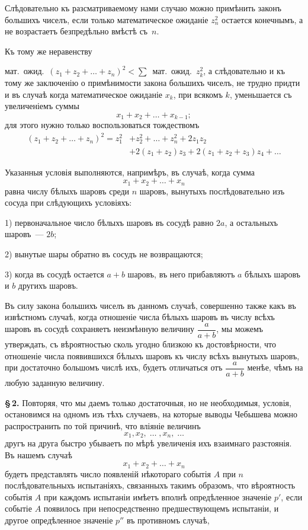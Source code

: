 \documentclass[12pt]{article}
\begin{document}
Слѣдовательно къ разсматриваемому нами случаю можно примѣнить законъ большихъ чиселъ, если только математическое ожиданіе $z_n^2$ остается конечнымъ, а не возрастаетъ безпредѣльно вмѣстѣ съ~$n$.

Къ тому же неравенству

мат.~ожид.\ $(z_1 + z_2 + \ldots + z_n)^2 < \sum$~мат.~ожид.\ $z^2_k$, а слѣдовательно и къ тому же заключенію о примѣнимости закона большихъ чиселъ, не трудно придти и въ случаѣ когда математическое ожиданіе $x_k$, при всякомъ $k$, уменьшается съ увеличеніемъ суммы
\[
x_1 + x_2 + \ldots + x_{k-1};
\]
для этого нужно только воспользоваться тождествомъ
\begin{align*}
(z_1 + z_2 + \ldots + z_n)^2 = z_1^2 &+ z_2^2 + \ldots + z_n^2 + 2z_1 z_2 \\
&+ 2(z_1 + z_2)z_3 + 2(z_1 + z_2 + z_3)z_4 + \ldots
\end{align*}

Указанныя условія выполняются, напримѣръ, въ случаѣ, когда сумма
\[
x_1 + x_2 + \ldots + x_n
\]
равна числу бѣлыхъ шаровъ среди $n$ шаровъ, вынутыхъ послѣдовательно изъ сосуда при слѣдующихъ условіяхъ:


1) первоначальное число бѣлыхъ шаровъ въ сосудѣ равно $2a$, а остальныхъ шаровъ~--- $2b$;

2) вынутые шары обратно въ сосудъ не возвращаются;

3) когда въ сосудѣ остается $a + b$ шаровъ, въ него прибавляютъ $a$ бѣлыхъ шаровъ и $b$ другихъ шаровъ.

Въ силу закона большихъ чиселъ въ данномъ случаѣ, совершенно также какъ въ извѣстномъ случаѣ, когда отношеніе числа бѣлыхъ шаровъ въ числу всѣхъ шаровъ въ сосудѣ сохраняетъ неизмѣнную величину $\dfrac{a}{a+b}$, мы можемъ утверждать, съ вѣроятностью сколь угодно близкою къ достовѣрности, что отношеніе числа появившихся бѣлыхъ шаровъ къ числу всѣхъ вынутыхъ шаровъ, при достаточно большомъ числѣ ихъ, будетъ отличаться отъ $\dfrac{a}{a+b}$ менѣе, чѣмъ на любую заданную величину.

\medskip

\noindent\textbf{\S\,2.} Повторяя, что мы даемъ только достаточныя, но не необходимыя, условія, остановимся на одномъ изъ тѣхъ случаевъ, на которые выводы Чебышева можно распространить по той причинѣ, что вліяніе величинъ
\[
x_1, x_2, \;\ldots\;, x_n, \;\ldots
\]
другъ на друга быстро убываетъ по мѣрѣ увеличенія ихъ взаимнаго разстоянія. Въ нашемъ случаѣ
\[
x_1 + x_2 + \ldots + x_n
\]
будетъ представлять число появленій нѣкотораго событія $A$ при $n$ послѣдовательныхъ испытаніяхъ, связанныхъ такимъ образомъ, что вѣроятность событія $A$ при каждомъ испытаніи имѣетъ вполнѣ опредѣленное значеніе $p'$, если событіе $A$ появилось при непосредственно предшествующемъ испытаніи, и другое опредѣленное значеніе $p''$ въ противномъ случаѣ,
\end{document}

